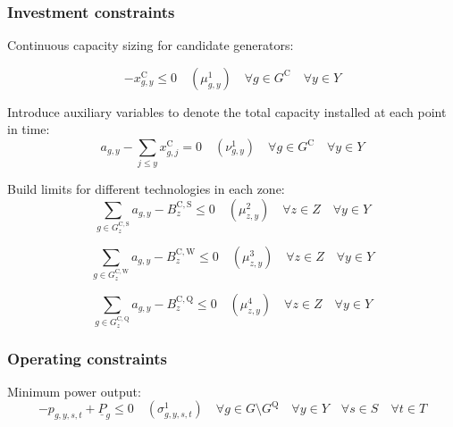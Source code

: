 \documentclass{article}
\newcommand{\sGenerators}{G}
\newcommand{\sGeneratorsCandidate}{G^{\mathrm{C}}}
\newcommand{\sGeneratorsCandidateWind}{G^{\mathrm{C,W}}}
\newcommand{\sGeneratorsCandidateSolar}{G^{\mathrm{C,S}}}
\newcommand{\sStorage}{G^{\mathrm{Q}}}
\newcommand{\sStorageCandidate}{G^{\mathrm{C,Q}}}
\newcommand{\sYears}{Y}
\newcommand{\sScenarios}{S}
\newcommand{\sIntervals}{T}
\newcommand{\sZones}{Z}
\newcommand{\iGenerator}{g}
\newcommand{\iYear}{y}
\newcommand{\iYearAlias}{j}
\newcommand{\iScenario}{s}
\newcommand{\iInterval}{t}
\newcommand{\iZone}{z}
\newcommand{\cBuildLimitWind}{B^{\mathrm{C,\mathrm{W}}}_{\iZone}}
\newcommand{\cBuildLimitSolar}{B^{\mathrm{C,\mathrm{S}}}_{\iZone}}
\newcommand{\cBuildLimitStorage}{B^{\mathrm{C,\mathrm{Q}}}_{\iZone}}
\newcommand{\cPowerOutputMin}[1][\iGenerator]{\underline{P}_{#1}}
\newcommand{\vInstalledCapacity}[1][\iGenerator,\iYear]{x^{\mathrm{C}}_{#1}}
\newcommand{\vPower}[1][\iGenerator,\iYear,\iScenario,\iInterval]{p_{#1}}
\newcommand{\vInstalledCapacityTotal}[1][\iGenerator,\iYear]{a_{#1}}
\newcommand{\dNonNegativeCandidateCapacity}[1][\iGenerator,\iYear]{\mu_{#1}^{1}}
\newcommand{\dSolarBuildLimit}[1][\iZone,\iYear]{\mu_{#1}^{2}}
\newcommand{\dWindBuildLimit}[1][\iZone,\iYear]{\mu_{#1}^{3}}
\newcommand{\dStorageBuildLimit}[1][\iZone,\iYear]{\mu_{#1}^{4}}
\newcommand{\dTotalInstallCapacity}[1][\iGenerator,\iYear]{\nu_{#1}^{1}}
\newcommand{\dMinPowerOutput}[1][\iGenerator,\iYear,\iScenario,\iInterval]{\sigma_{#1}^{1}}
\newcommand{\sScenarioSets}{\quad \forall \iYear \in \sYears \quad \forall \iScenario \in \sScenarios \quad \forall \iInterval \in \sIntervals}
\begin{document}
\subsubsection{Investment constraints}
Continuous capacity sizing for candidate generators:

\begin{equation}
	- \vInstalledCapacity[\iGenerator,\iYear] \leq 0 \quad (\dNonNegativeCandidateCapacity) \quad \forall \iGenerator \in \sGeneratorsCandidate \quad \forall \iYear \in \sYears
\end{equation}

Introduce auxiliary variables to denote the total capacity installed at each point in time:
\begin{equation}
	\vInstalledCapacityTotal - \sum\limits_{\iYearAlias \leq \iYear} \vInstalledCapacity[\iGenerator,\iYearAlias] = 0 \quad (\dTotalInstallCapacity) \quad \forall \iGenerator \in \sGeneratorsCandidate \quad \forall \iYear \in \sYears
\end{equation}

Build limits for different technologies in each zone:
\begin{equation}
	\sum\limits_{\iGenerator \in \sGeneratorsCandidateSolar_{\iZone}} \vInstalledCapacityTotal - \cBuildLimitSolar \leq 0 \quad (\dSolarBuildLimit) \quad \forall \iZone \in \sZones \quad \forall \iYear \in \sYears
\end{equation}

\begin{equation}
	\sum\limits_{\iGenerator \in \sGeneratorsCandidateWind_{\iZone}} \vInstalledCapacityTotal - \cBuildLimitWind \leq 0 \quad (\dWindBuildLimit) \quad \forall \iZone \in \sZones \quad \forall \iYear \in \sYears 
\end{equation}

\begin{equation}
	\sum\limits_{\iGenerator \in \sStorageCandidate_{\iZone}} \vInstalledCapacityTotal - \cBuildLimitStorage \leq 0  \quad (\dStorageBuildLimit) \quad \forall \iZone \in \sZones \quad \forall \iYear \in \sYears
\end{equation}

\subsubsection{Operating constraints}
Minimum power output:
\begin{equation}
	-\vPower + \cPowerOutputMin \leq 0 \quad (\dMinPowerOutput) \quad \forall \iGenerator \in \sGenerators \setminus \sStorage \sScenarioSets
\end{equation}
\end{document}

